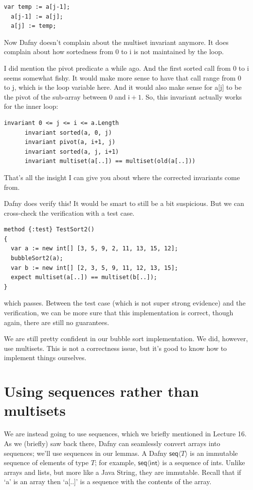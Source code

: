 \documentclass[11pt]{article}
\begin{document}
\begin{lstlisting}[language=dafny]
  var temp := a[j-1];
  a[j-1] := a[j];
  a[j] := temp;
\end{lstlisting}

Now Dafny doesn't complain about the multiset invariant anymore. It
does complain about how sortedness from 0 to \textsf{i} is not
maintained by the loop.

I did mention the \textsf{pivot} predicate a while ago. And the first \textsf{sorted} call from $0$ to \textsf{i} seems
somewhat fishy. It would make more sense to have that call range from 0 to j, which is the loop variable here.
And it would also make sense for \textsf{a[j]} to be the pivot of the sub-array between 0 and $\mathsf{i}+1$.
So, this invariant actually works for the inner loop:
\begin{lstlisting}[language=dafny]
      invariant 0 <= j <= i <= a.Length
      invariant sorted(a, 0, j)
      invariant pivot(a, i+1, j)
      invariant sorted(a, j, i+1)
      invariant multiset(a[..]) == multiset(old(a[..]))
\end{lstlisting}
That's all the insight I can give you about where the corrected invariants come from.

Dafny does verify this! It would be smart to still be a bit suspicious. But we can cross-check the verification with a test case.
\begin{lstlisting}[language=dafny]
method {:test} TestSort2()
{
  var a := new int[] [3, 5, 9, 2, 11, 13, 15, 12];
  bubbleSort2(a);
  var b := new int[] [2, 3, 5, 9, 11, 12, 13, 15];
  expect multiset(a[..]) == multiset(b[..]);
}
\end{lstlisting}
which passes. Between the test case (which is not super strong evidence) and the verification, we can be more sure that
this implementation is correct, though again, there are still no guarantees.

We are still pretty confident in our bubble sort implementation. We did, however, use multisets.
This is not a correctness issue, but it's good to know how to implement things ourselves.


\section*{Using sequences rather than multisets}
We are instead going to use sequences, which we briefly mentioned in Lecture 16. As we (briefly) saw back there,
Dafny can seamlessly convert arrays into sequences; we'll use sequences in our lemmas.
A Dafny $\mathsf{seq}\langle T \rangle$ is an immutable sequence of elements of type $T$;
for example, $\mathsf{seq}\langle \mathsf{int} \rangle$ is a sequence of \textsf{int}s. Unlike arrays and lists,
but more like a Java String, they are immutable. Recall that if `a' is an array then `a[..]' is a sequence
with the contents of the array.
\end{document}
